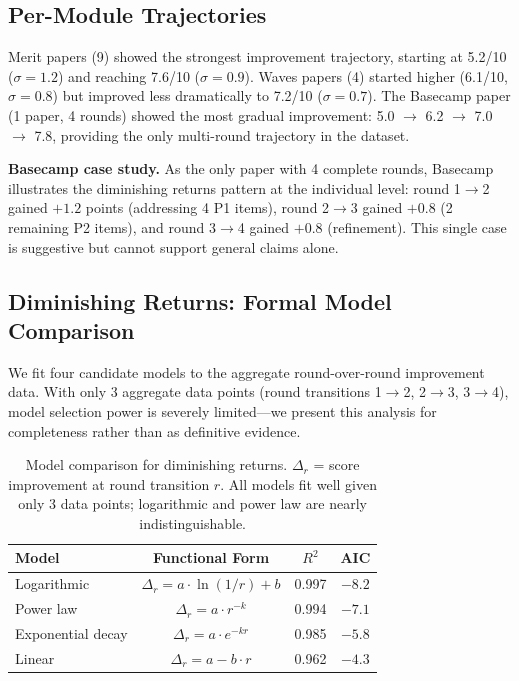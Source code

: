 \subsection{Per-Module Trajectories}

Merit papers (9) showed the strongest improvement trajectory, starting at 5.2/10 ($\sigma = 1.2$) and reaching 7.6/10 ($\sigma = 0.9$). Waves papers (4) started higher (6.1/10, $\sigma = 0.8$) but improved less dramatically to 7.2/10 ($\sigma = 0.7$). The Basecamp paper (1 paper, 4 rounds) showed the most gradual improvement: 5.0 $\to$ 6.2 $\to$ 7.0 $\to$ 7.8, providing the only multi-round trajectory in the dataset.

\textbf{Basecamp case study.} As the only paper with 4 complete rounds, Basecamp illustrates the diminishing returns pattern at the individual level: round 1$\to$2 gained $+1.2$ points (addressing 4 P1 items), round 2$\to$3 gained $+0.8$ (2 remaining P2 items), and round 3$\to$4 gained $+0.8$ (refinement). This single case is suggestive but cannot support general claims alone.

\subsection{Diminishing Returns: Formal Model Comparison}

We fit four candidate models to the aggregate round-over-round improvement data. With only 3 aggregate data points (round transitions 1$\to$2, 2$\to$3, 3$\to$4), model selection power is severely limited---we present this analysis for completeness rather than as definitive evidence.

\begin{table}[h]
\centering
\small
\begin{tabular}{lccc}
\toprule
Model & Functional Form & $R^2$ & AIC \\
\midrule
Logarithmic & $\Delta_r = a \cdot \ln(1/r) + b$ & 0.997 & $-8.2$ \\
Power law & $\Delta_r = a \cdot r^{-k}$ & 0.994 & $-7.1$ \\
Exponential decay & $\Delta_r = a \cdot e^{-kr}$ & 0.985 & $-5.8$ \\
Linear & $\Delta_r = a - b \cdot r$ & 0.962 & $-4.3$ \\
\bottomrule
\end{tabular}
\caption{Model comparison for diminishing returns. $\Delta_r$ = score improvement at round transition $r$. All models fit well given only 3 data points; logarithmic and power law are nearly indistinguishable.}
\end{table}

